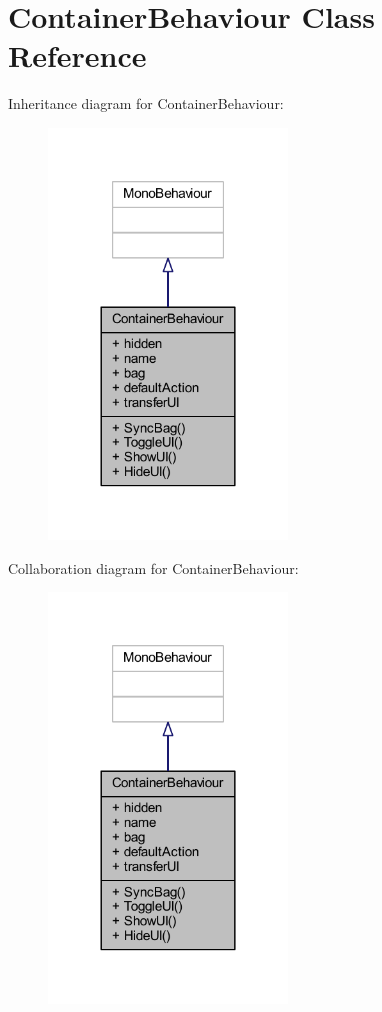 \hypertarget{class_container_behaviour}{}\section{Container\+Behaviour Class Reference}
\label{class_container_behaviour}


Inheritance diagram for Container\+Behaviour\+:\nopagebreak
\begin{figure}[H]
\begin{center}
\leavevmode
\includegraphics[width=180pt]{class_container_behaviour__inherit__graph}
\end{center}
\end{figure}


Collaboration diagram for Container\+Behaviour\+:\nopagebreak
\begin{figure}[H]
\begin{center}
\leavevmode
\includegraphics[width=180pt]{class_container_behaviour__coll__graph}
\end{center}
\end{figure}
